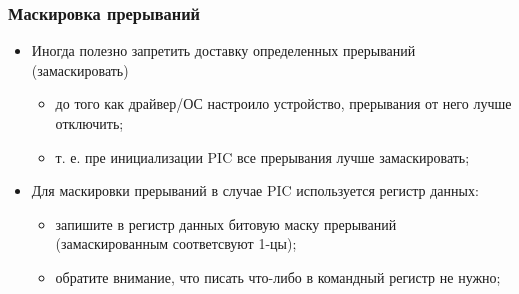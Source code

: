 \begin{frame}
\frametitle{Маскировка прерываний}
\begin{itemize}
  \item Иногда полезно запретить доставку определенных прерываний
  (замаскировать)
  \begin{itemize}
    \item до того как драйвер/ОС настроило устройство, прерывания от него лучше
    отключить;
    \item т. е. пре инициализации PIC все прерывания лучше замаскировать;
  \end{itemize}
  \item Для маскировки прерываний в случае PIC используется регистр данных:
  \begin{itemize}
    \item запишите в регистр данных битовую маску прерываний (замаскированным
    соответсвуют 1-цы);
    \item обратите внимание, что писать что-либо в командный регистр не нужно;
  \end{itemize}
\end{itemize}
\end{frame}
